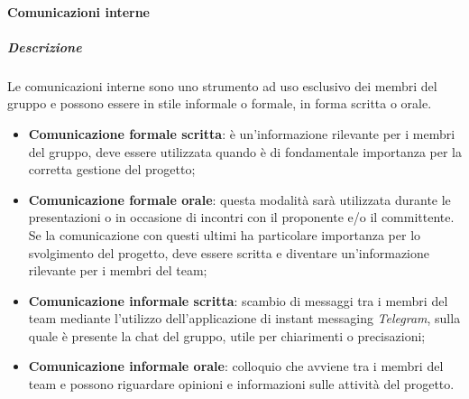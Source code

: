			\paragraph{Comunicazioni interne}
			\subparagraph{Descrizione}
			Le comunicazioni interne sono uno strumento ad uso esclusivo dei membri del gruppo e possono essere in stile informale o formale, in forma scritta o orale. 
				\begin{itemize}
					\item \textbf{Comunicazione formale scritta}: è un'informazione rilevante per i membri del gruppo, deve essere utilizzata quando è di fondamentale importanza per la corretta gestione del progetto;
					\item \textbf{Comunicazione formale orale}: questa modalità sarà utilizzata durante le presentazioni o in occasione di incontri con il proponente e/o il committente. Se la comunicazione con questi ultimi ha particolare importanza per lo svolgimento del progetto, deve essere scritta e diventare un'informazione rilevante per i membri del team;
					\item \textbf{Comunicazione informale scritta}: scambio di messaggi tra i membri del team mediante l'utilizzo dell'applicazione di instant messaging \textit{Telegram}, sulla quale è presente la chat del gruppo, utile per chiarimenti o precisazioni;
					\item \textbf{Comunicazione informale orale}: colloquio che avviene tra i membri del team e possono riguardare opinioni e informazioni sulle attività del progetto. 
				\end{itemize}

